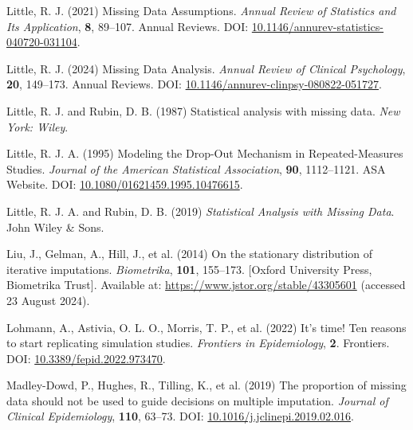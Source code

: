 \documentclass[
  letterpaper,
  DIV=11,
  numbers=noendperiod]{scrreprt}
\newlength{\cslhangindent}
\newenvironment{CSLReferences}[2] %
 {\begin{list}{}{%
  \setlength{\itemindent}{0pt}
  \setlength{\leftmargin}{0pt}
  \setlength{\parsep}{0pt}
  \ifodd #1
   \setlength{\leftmargin}{\cslhangindent}
   \setlength{\itemindent}{-1\cslhangindent}
  \fi
  \setlength{\itemsep}{#2\baselineskip}}}
 {\end{list}}
\begin{document}
\begin{CSLReferences}{1}{1}
Little, R. J. (2021) Missing {Data Assumptions}. \emph{Annual Review of
Statistics and Its Application}, \textbf{8}, 89--107. Annual Reviews.
DOI:
\href{https://doi.org/10.1146/annurev-statistics-040720-031104}{10.1146/annurev-statistics-040720-031104}.

Little, R. J. (2024) Missing {Data Analysis}. \emph{Annual Review of
Clinical Psychology}, \textbf{20}, 149--173. Annual Reviews. DOI:
\href{https://doi.org/10.1146/annurev-clinpsy-080822-051727}{10.1146/annurev-clinpsy-080822-051727}.

Little, R. J. and Rubin, D. B. (1987) Statistical analysis with missing
data. \emph{New York: Wiley}.

Little, R. J. A. (1995) Modeling the {Drop-Out Mechanism} in
{Repeated-Measures Studies}. \emph{Journal of the American Statistical
Association}, \textbf{90}, 1112--1121. ASA Website. DOI:
\href{https://doi.org/10.1080/01621459.1995.10476615}{10.1080/01621459.1995.10476615}.

Little, R. J. A. and Rubin, D. B. (2019) \emph{Statistical {Analysis}
with {Missing Data}}. John Wiley \& Sons.

Liu, J., Gelman, A., Hill, J., et al. (2014) On the stationary
distribution of iterative imputations. \emph{Biometrika}, \textbf{101},
155--173. {[}Oxford University Press, Biometrika Trust{]}. Available at:
\url{https://www.jstor.org/stable/43305601} (accessed 23 August 2024).

Lohmann, A., Astivia, O. L. O., Morris, T. P., et al. (2022) It's time!
{Ten} reasons to start replicating simulation studies. \emph{Frontiers
in Epidemiology}, \textbf{2}. Frontiers. DOI:
\href{https://doi.org/10.3389/fepid.2022.973470}{10.3389/fepid.2022.973470}.

Madley-Dowd, P., Hughes, R., Tilling, K., et al. (2019) The proportion
of missing data should not be used to guide decisions on multiple
imputation. \emph{Journal of Clinical Epidemiology}, \textbf{110},
63--73. DOI:
\href{https://doi.org/10.1016/j.jclinepi.2019.02.016}{10.1016/j.jclinepi.2019.02.016}.


\end{CSLReferences}
\end{document}
